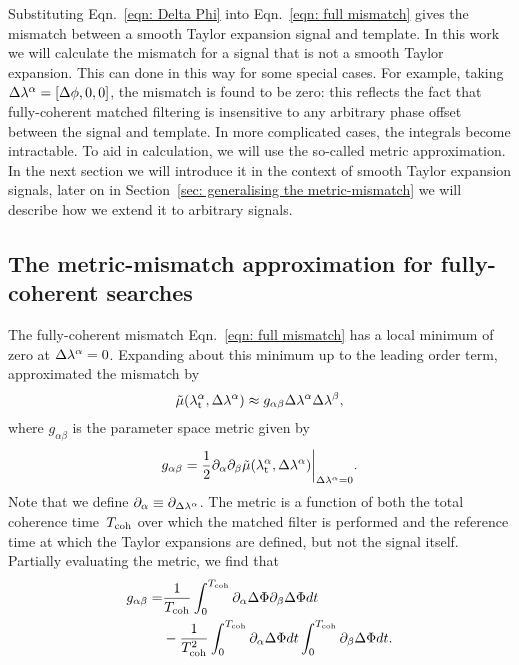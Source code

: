 \documentclass[../full_thesis/full_thesis.tex]{subfiles}
\begin{document}
Substituting Eqn.~\eqref{eqn: Delta Phi} into Eqn.~\eqref{eqn: full mismatch}
gives the mismatch between a smooth Taylor expansion signal and template. In
this work we will calculate the mismatch for a signal that is not a smooth
Taylor expansion. This can done in this way for some special cases. For
example, taking $\Delta\lambda^{\alpha} = [\Delta\phi, 0, 0]$, the mismatch is found to be
zero: this reflects the fact that fully-coherent matched filtering is
insensitive to any arbitrary phase offset between the signal and template. In
more complicated cases, the integrals become intractable. To aid in
calculation, we will use the so-called metric approximation. In the next section
we will introduce it in the context of smooth Taylor expansion signals, later on
in Section~\ref{sec: generalising the metric-mismatch} we will describe how we
extend it to arbitrary signals.

\subsection{The metric-mismatch approximation for fully-coherent searches}
\label{sec: the metric-mismatch approximation for fully-coherent searches}

The fully-coherent mismatch Eqn.~\eqref{eqn: full mismatch} has a local
minimum of zero at $\Delta\lambda^{\alpha}=0$. Expanding about this minimum up to the
leading order term, \citet{Brady1998} approximated the mismatch by
\begin{equation}
\tilde{\mu}({\lambda}_\textrm{t}^{\alpha}, \Delta\lambda^{\alpha}) \approx
g_{\alpha\beta}\Delta\lambda^{\alpha}\Delta\lambda^{\beta},
\label{eqn: mismatch metric single}
\end{equation}
where $g_{\alpha\beta}$ is the parameter space metric given by
\begin{equation}
    g_{\alpha\beta} =
    \frac{1}{2}\partial_{\alpha}\partial_{\beta}
    \tilde{\mu}({\lambda}_\textrm{t}^{\alpha}, \Delta\lambda^{\alpha}) \biggr\rvert_{\Delta\lambda^{\alpha}=0}.
\end{equation}
Note that we define $\partial_{\alpha} \equiv \partial_{\Delta\lambda^{\alpha}}$.
The metric is a function  of both the total coherence time~$T_{\mathrm{coh}}$ over which the
matched filter is performed and the reference time at which the Taylor expansions
are defined, but not the signal itself. Partially evaluating the metric, we find that
\begin{align}
\begin{split}
    g_{\alpha \beta} = &
    \frac{1}{T_{\mathrm{coh}}}\int_{0}^{T_{\mathrm{coh}}}\partial_{\alpha}\Delta\Phi
                               \partial_{\beta}\Delta\Phi dt \\
   & -\frac{1}{T_{\mathrm{coh}}^{2}}\int_{0}^{T_{\mathrm{coh}}} \partial_{\alpha}\Delta\Phi dt
                 \int_{0}^{T_{\mathrm{coh}}} \partial_{\beta}\Delta\Phi dt.
\end{split}
\label{eqn: fully-coherent metric simple}
\end{align}
\end{document}
